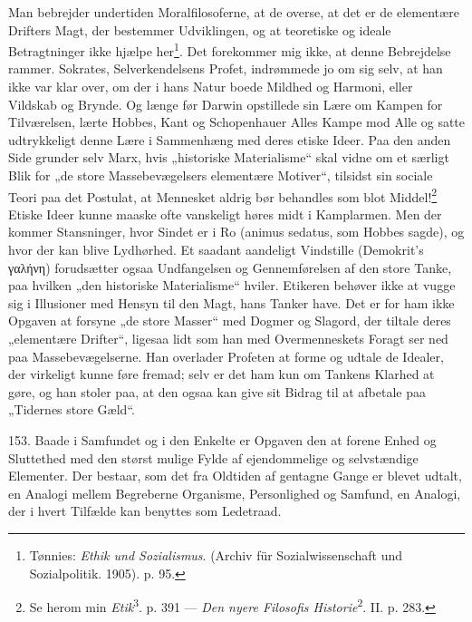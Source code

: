 \documentclass[12pt,a4paper]{book}
\newcommand{\apage}[1]{\marginnote{\footnotesize\textit{[#1]}}}
\begin{document}
Man bebrejder undertiden Moralfilosoferne, at de overse, at det er de elementære Drifters
Magt, der bestemmer Udviklingen, og at teoretiske og ideale Betragtninger ikke hjælpe
her\footnote{Tønnies: \emph{Ethik und Sozialismus}. (Archiv für Sozialwissenschaft und
Sozialpolitik. 1905). p. 95.}. Det forekommer mig ikke, at denne Bebrejdelse rammer.
Sokrates, Selverkendelsens Profet, indrømmede jo om sig selv, at han ikke var klar over, om
der i hans Natur boede Mildhed og Harmoni, eller Vildskab og Brynde. Og længe før Darwin
opstillede sin Lære om Kampen for Tilværelsen, lærte Hobbes, Kant og Schopenhauer Alles
Kampe mod Alle og satte udtrykkeligt denne Lære i Sammenhæng med deres etiske Ideer. Paa
den anden Side grunder selv Marx, hvis „historiske Materialisme“ skal vidne om et særligt
Blik for „de store Massebevægelsers elementære Motiver“, tilsidst sin sociale Teori paa det
Postulat, at Mennesket aldrig bør behandles som blot Middel!\footnote{Se herom min
\emph{Etik}\textsuperscript{3}. p. 391 --- \emph{Den nyere Filosofis Historie}\textsuperscript{2}.
II. p. 283.} Etiske Ideer kunne maaske ofte vanskeligt høres midt i Kamplarmen. Men der
kommer Stansninger, hvor Sindet er i Ro (animus sedatus, \apage{365} som Hobbes sagde), og hvor der kan
blive Lydhørhed. Et saadant aandeligt Vindstille (Demokrit's γαλήνη) forudsætter ogsaa
Undfangelsen og Gennemførelsen af den store Tanke, paa hvilken „den historiske Materialisme“
hviler. Etikeren behøver ikke at vugge sig i Illusioner med Hensyn til den Magt, hans
Tanker have. Det er for ham ikke Opgaven at forsyne „de store Masser“ med Dogmer og
Slagord, der tiltale deres „elementære Drifter“, ligesaa lidt som han med Overmenneskets
Foragt ser ned paa Massebevægelserne. Han overlader Profeten at forme og udtale de Idealer,
der virkeligt kunne føre fremad; selv er det ham kun om Tankens Klarhed at gøre, og han
stoler paa, at den ogsaa kan give sit Bidrag til at afbetale paa „Tidernes store Gæld“.

153. Baade i Samfundet og i den Enkelte er Opgaven den at forene Enhed og Sluttethed med
den størst mulige Fylde af ejendommelige og selvstændige Elementer. Der bestaar, som det
fra Oldtiden af gentagne Gange er blevet udtalt, en Analogi mellem Begreberne Organisme,
Personlighed og Samfund, en Analogi, der i hvert Tilfælde kan benyttes som Ledetraad.
\end{document}
